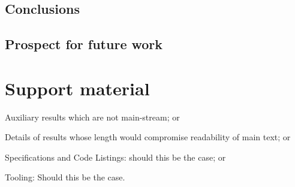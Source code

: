 \documentclass[
  oneside,
  11pt, a4paper,
  footinclude=true,
  headinclude=true,
  cleardoublepage=empty
]{scrbook}
\begin{document}
	\section{Conclusions}
	\section{Prospect for future work}


	




	\chapter{Support material}
	Auxiliary results which are not main-stream; or

	Details of results whose length would compromise readability of main text; or

	Specifications and Code Listings: should this be the case; or

	Tooling: Should this be the case.



\end{document}
